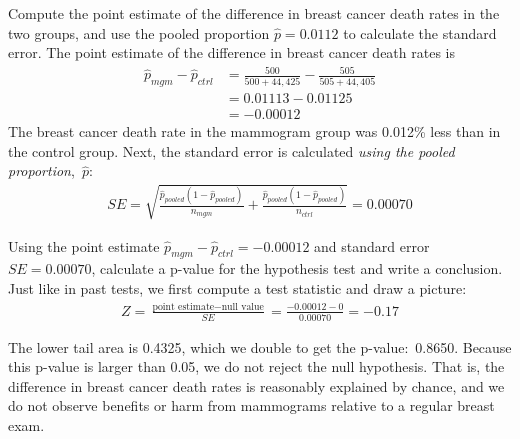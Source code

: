 \begin{examplewrap}
\begin{nexample}{Compute the point estimate of the difference in breast cancer death rates in the two groups, and use the pooled proportion $\hat{p} = 0.0112$ to calculate the standard error.}
The point estimate of the difference in breast cancer death rates is
\begin{align*}
\hat{p}_{mgm} - \hat{p}_{ctrl}
	&= \frac{500}{500 + 44,425} - \frac{505}{505 + 44,405} \\
	&= 0.01113 - 0.01125 \\
	&= -0.00012
\end{align*}
The breast cancer death rate in the mammogram group was 0.012\% less than in the control group. Next, the standard error is calculated \emph{using the pooled proportion},~$\hat{p}$:
\begin{align*}
SE = \sqrt{
      \frac{\hat{p}_{\textit{pooled}}(1-\hat{p}_{\textit{pooled}})}
          {n_{mgm}}
      + \frac{\hat{p}_{\textit{pooled}}(1-\hat{p}_{\textit{pooled}})}
          {n_{ctrl}}
    }
	= 0.00070
\end{align*}
\end{nexample}
\end{examplewrap}

\newpage

\begin{examplewrap}
\begin{nexample}{Using the point estimate $\hat{p}_{mgm} - \hat{p}_{ctrl} = -0.00012$ and standard error $SE = 0.00070$, calculate a p-value for the hypothesis test and write a conclusion.}
Just like in past tests, we first compute a test statistic and draw a picture:
\begin{align*}
Z = \frac{\text{point estimate} - \text{null value}}{SE}
	= \frac{-0.00012 - 0}{0.00070}
	= -0.17
\end{align*}
\begin{center}
\end{center}
The lower tail area is 0.4325, which we double to get the p-value:~0.8650. Because this p-value is larger than 0.05, we do not reject the null hypothesis. That is, the difference in breast cancer death rates is reasonably explained by chance, and we do not observe benefits or harm from mammograms relative to a regular breast exam.
\end{nexample}
\end{examplewrap}


